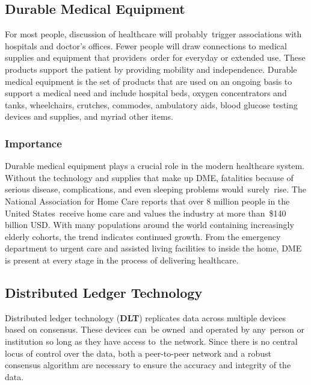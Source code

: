 \documentclass[letterpaper]{article}
\begin{document}
\subsection{Durable Medical Equipment}
For most people, discussion of healthcare will probably trigger associations with hospitals and doctor's offices. Fewer people will draw connections to medical supplies and equipment that providers order for everyday or extended use. These products support the patient by providing mobility and independence.
%
Durable medical equipment is the set of products that are used on an ongoing basis to support a medical need and include hospital beds, oxygen concentrators and tanks, wheelchairs, crutches, commodes, ambulatory aids, blood glucose testing devices and supplies, and myriad other items.
%
  \subsubsection{Importance}
Durable medical equipment plays a crucial role in the modern healthcare system. Without the technology and supplies that make up DME, fatalities because of serious disease, complications, and even sleeping problems would surely rise. The National Association for Home Care reports that over 8 million people in the United States receive home care and values the industry at more than \$140 billion USD. With many populations around the world containing increasingly elderly cohorts, the trend indicates continued growth. From the emergency department to urgent care and assisted living facilities to inside the home, DME is present at every stage in the process of delivering healthcare.
%
\subsection{Distributed Ledger Technology}
Distributed ledger technology (\textbf{DLT}) replicates data across multiple devices based on consensus. These devices can be owned and operated by any person or institution so long as they have access to the network. Since there is no central locus of control over the data, both a peer-to-peer network and a robust consensus algorithm are necessary to ensure the accuracy and integrity of the data.
%
\end{document}
